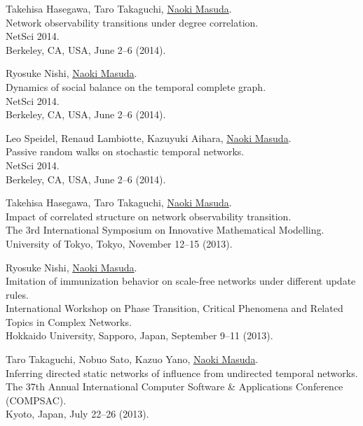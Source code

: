 \documentclass[11pt,letter]{article}
\begin{document}
\begin{etaremune}
\item Takehisa Hasegawa, Taro Takaguchi, \underline{Naoki Masuda}.\\
Network observability transitions under degree correlation.\\
NetSci 2014.\\
Berkeley, CA, USA, June 2--6 (2014).

\item Ryosuke Nishi, \underline{Naoki Masuda}.\\
Dynamics of social balance on the temporal complete graph.\\
NetSci 2014.\\
Berkeley, CA, USA, June 2--6 (2014).

\item Leo Speidel, Renaud Lambiotte, Kazuyuki Aihara, \underline{Naoki Masuda}.\\
Passive random walks on stochastic temporal networks.\\
NetSci 2014.\\
Berkeley, CA, USA, June 2--6 (2014).

\item Takehisa Hasegawa, Taro Takaguchi, \underline{Naoki Masuda}.\\
Impact of correlated structure on network observability transition.\\
The 3rd International Symposium on Innovative Mathematical Modelling.\\
University of Tokyo, Tokyo, November 12--15 (2013).

\item Ryosuke Nishi, \underline{Naoki Masuda}.\\
Imitation of immunization behavior on scale-free networks under different update rules.\\
International Workshop on Phase Transition, Critical Phenomena and Related Topics in Complex Networks.\\
Hokkaido University, Sapporo, Japan, September 9--11 (2013).

\item Taro Takaguchi, Nobuo Sato, Kazuo Yano, \underline{Naoki Masuda}.\\
Inferring directed static networks of influence from undirected temporal networks.\\
The 37th Annual International Computer Software \& Applications Conference (COMPSAC).\\
Kyoto, Japan, July 22--26 (2013).


\end{etaremune}
\end{document}
